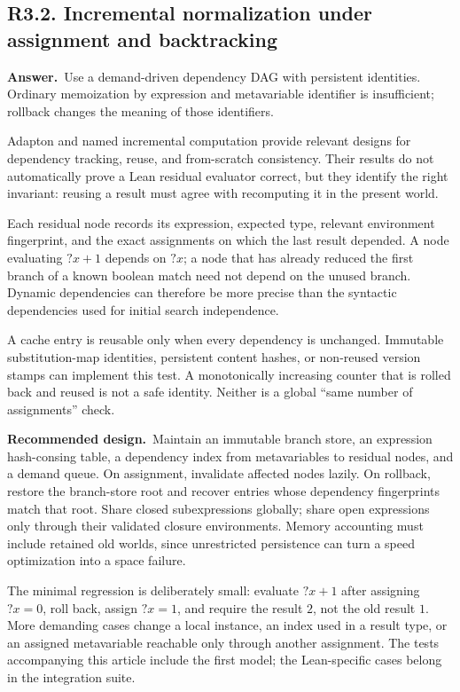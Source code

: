 \documentclass[11pt,a4paper]{article}
\newcommand{\qid}[3]{\subsection{#2. #3}\label{#1}}
\newcommand{\answer}{\noindent\textbf{Answer.}\ }
\newcommand{\proposal}{\noindent\textbf{Recommended design.}\ }
\theoremstyle{remark}
\begin{document}
\qid{q32}{R3.2}{Incremental normalization under assignment and backtracking}
\answer Use a demand-driven dependency DAG with persistent identities. Ordinary memoization by expression and metavariable identifier is insufficient; rollback changes the meaning of those identifiers.

Adapton and named incremental computation provide relevant designs for dependency tracking, reuse, and from-scratch consistency. Their results do not automatically prove a Lean residual evaluator correct, but they identify the right invariant: reusing a result must agree with recomputing it in the present world.~\cite{adapton,names}

Each residual node records its expression, expected type, relevant environment fingerprint, and the exact assignments on which the last result depended. A node evaluating $?x+1$ depends on $?x$; a node that has already reduced the first branch of a known boolean match need not depend on the unused branch. Dynamic dependencies can therefore be more precise than the syntactic dependencies used for initial search independence.

A cache entry is reusable only when every dependency is unchanged. Immutable substitution-map identities, persistent content hashes, or non-reused version stamps can implement this test. A monotonically increasing counter that is rolled back and reused is not a safe identity. Neither is a global ``same number of assignments'' check.

\proposal Maintain an immutable branch store, an expression hash-consing table, a dependency index from metavariables to residual nodes, and a demand queue. On assignment, invalidate affected nodes lazily. On rollback, restore the branch-store root and recover entries whose dependency fingerprints match that root. Share closed subexpressions globally; share open expressions only through their validated closure environments. Memory accounting must include retained old worlds, since unrestricted persistence can turn a speed optimization into a space failure.

The minimal regression is deliberately small: evaluate $?x+1$ after assigning $?x=0$, roll back, assign $?x=1$, and require the result $2$, not the old result $1$. More demanding cases change a local instance, an index used in a result type, or an assigned metavariable reachable only through another assignment. The tests accompanying this article include the first model; the Lean-specific cases belong in the integration suite.
\end{document}
